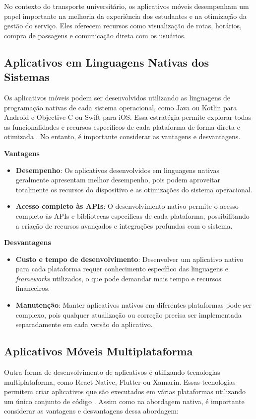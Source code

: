 \documentclass[
    12pt,                   %
    openright,              %
    oneside,                %
    a4paper,                %
    sumario=tradicional,    %
    english,                %
    brazil,                 %
    ]{abntex2}
\begin{document}
\newpage

No contexto do transporte universitário, os aplicativos móveis desempenham um papel importante na melhoria da experiência dos estudantes e na otimização da gestão do serviço. Eles oferecem recursos como visualização de rotas, horários, compra de passagens e comunicação direta com os usuários.

\subsection{Aplicativos em Linguagens Nativas dos Sistemas}
\label{subsec:aplicativos-nativos}
Os aplicativos móveis podem ser desenvolvidos utilizando as linguagens de programação nativas de cada sistema operacional, como Java ou Kotlin para Android e Objective-C ou Swift para iOS. Essa estratégia permite explorar todas as funcionalidades e recursos específicos de cada plataforma de forma direta e otimizada \cite{pinheiro-analise-apps-mobile}. No entanto, é importante considerar as vantagens e desvantagens.

\textbf{Vantagens}
\begin{itemize}
  \item \textbf{Desempenho}: Os aplicativos desenvolvidos em linguagens nativas geralmente apresentam melhor desempenho, pois podem aproveitar totalmente os recursos do dispositivo e as otimizações do sistema operacional.
  \item \textbf{Acesso completo às APIs}: O desenvolvimento nativo permite o acesso completo às APIs e bibliotecas específicas de cada plataforma, possibilitando a criação de recursos avançados e integrações profundas com o sistema.
\end{itemize}

\textbf{Desvantagens}
\begin{itemize}
  \item \textbf{Custo e tempo de desenvolvimento}: Desenvolver um aplicativo nativo para cada plataforma requer conhecimento específico das linguagens e  \textit{frameworks} utilizados, o que pode demandar mais tempo e recursos financeiros.
  \item \textbf{Manutenção}: Manter aplicativos nativos em diferentes plataformas pode ser complexo, pois qualquer atualização ou correção precisa ser implementada separadamente em cada versão do aplicativo.
\end{itemize}

\subsection{Aplicativos Móveis Multiplataforma}
\label{subsec:aplicativos-multiplataforma}
Outra forma de desenvolvimento de aplicativos é utilizando tecnologias multiplataforma, como React Native, Flutter ou Xamarin. Essas tecnologias permitem criar aplicativos que são executados em várias plataformas utilizando um único conjunto de código \cite{accurate-nativexmult}. Assim como na abordagem nativa, é importante considerar as vantagens e desvantagens dessa abordagem:
\end{document}
